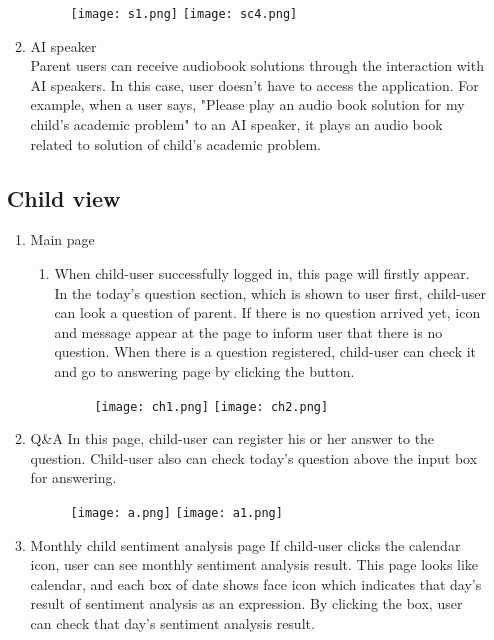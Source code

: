 \documentclass[conference]{IEEEtran}
\begin{document}
\begin{enumerate}
\begin{enumerate}
                  \begin{figure}[H]
                 \centering
                 \texttt{[image: s1.png]}
                 \texttt{[image: sc4.png]}
                 \end{figure}
                \item AI speaker\\
                Parent users can receive audiobook solutions through the interaction with AI speakers. In this case, user doesn't have to access the application. For example, when a user says, "Please play an audio book solution for my child's academic problem" to an AI speaker, it plays an audio book related to solution of child's academic problem.
            \end{enumerate}
        \subsection{Child view}
        \begin{enumerate}
            \item Main page
            
            \begin{enumerate}
                \item When child-user successfully logged in, this page will firstly appear. In the today’s question section, which is shown to user first, child-user can look a question of parent. If there is no question arrived yet, icon and message appear at the page to inform user that there is no question. When there is a question registered, child-user can check it and go to answering page by clicking the button.
                \begin{figure}[H]
                 \centering
                 \texttt{[image: ch1.png]}
                 \texttt{[image: ch2.png]}
                 \end{figure}
                 
            \end{enumerate}
            \item Q\&A \hfill\break
            In this page, child-user can register his or her answer to the question. Child-user also can check today’s question above the input box for answering.
            \begin{figure}[H]
                 \centering
                 \texttt{[image: a.png]}
                 \texttt{[image: a1.png]}
                 \end{figure}
            \item Monthly child sentiment analysis page \hfill \break
            If child-user clicks the calendar icon, user can see monthly sentiment analysis result. This page looks like calendar, and each box of date shows face icon which indicates that day’s result of sentiment analysis as an expression. By clicking the box, user can check that day’s sentiment analysis result.
        \end{enumerate}
        \end{enumerate}
\end{document}
